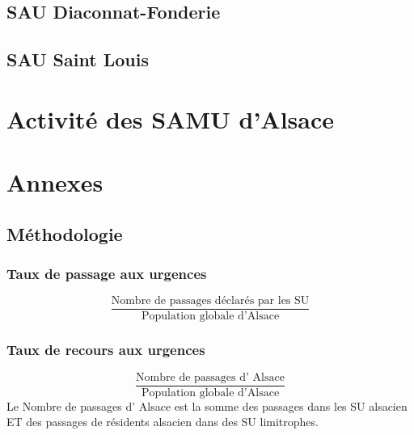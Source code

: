 \documentclass[12pt,english,french,twoside]{report}\usepackage[]{graphicx}\usepackage[]{color}
\begin{document}
\chapter{SAU Diaconnat-Fonderie}
\chapter{SAU Saint Louis}

\part{Activité des SAMU d'Alsace}





\part{Annexes}

\newpage
\appendix
\chapter{Méthodologie}


\section*{Taux de passage aux urgences}
  \begin{displaymath}
    \frac{\text{Nombre de passages déclarés par les SU}}{\text{Population globale d'Alsace}}
  \end{displaymath}

\section*{Taux de recours aux urgences}
\begin{displaymath}
    \frac{\text{Nombre de passages d' Alsace}}{\text{Population globale d'Alsace}}
  \end{displaymath}
Le Nombre de passages d' Alsace est la somme des passages dans les SU alsacien ET des passages de résidents alsacien dans des SU limitrophes.
\end{document}

